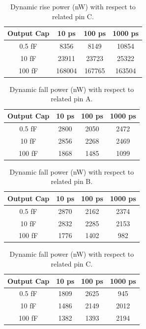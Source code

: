 \documentclass[12pt]{article}
\begin{document}
\begin{table}[H]
	\centering
	\begin{tabular}{|c|c|c|c|}
		\hline
		Output Cap & 10 ps  & 100 ps & 1000 ps \\
		\hline
		0.5 fF     & 8356   & 8149   & 10854   \\
		10 fF      & 23911  & 23723  & 25322   \\
		100 fF     & 168004 & 167765 & 163504  \\
		\hline
	\end{tabular}
	\caption{Dynamic rise power (nW) with respect to related pin C.}
	\label{tab:rise_power_C}
\end{table}



\begin{table}[H]
	\centering
	\begin{tabular}{|c|c|c|c|}
		\hline
		Output Cap & 10 ps & 100 ps & 1000 ps \\
		\hline
		0.5 fF     & 2800  & 2050   & 2472    \\
		10 fF      & 2856  & 2268   & 2469    \\
		100 fF     & 1868  & 1485   & 1099    \\
		\hline
	\end{tabular}
	\caption{Dynamic fall power (nW) with respect to related pin A.}
	\label{tab:fall_power_A}
\end{table}

\begin{table}[H]
	\centering
	\begin{tabular}{|c|c|c|c|}
		\hline
		Output Cap & 10 ps & 100 ps & 1000 ps \\
		\hline
		0.5 fF     & 2870  & 2162   & 2374    \\
		10 fF      & 2832  & 2285   & 2153    \\
		100 fF     & 1776  & 1402   & 982     \\
		\hline
	\end{tabular}
	\caption{Dynamic fall power (nW) with respect to related pin B.}
	\label{tab:fall_power_B}
\end{table}

\begin{table}[H]
	\centering
	\begin{tabular}{|c|c|c|c|}
		\hline
		Output Cap & 10 ps & 100 ps & 1000 ps \\
		\hline
		0.5 fF     & 1809  & 2625   & 945     \\
		10 fF      & 1486  & 2149   & 2012    \\
		100 fF     & 1382  & 1393   & 2194    \\
		\hline
	\end{tabular}
	\caption{Dynamic fall power (nW) with respect to related pin C.}
	\label{tab:fall_power_C}
\end{table}
\end{document}
